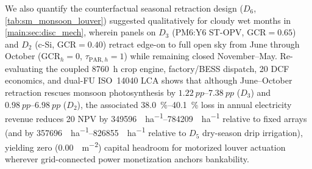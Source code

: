 \documentclass[preprint,12pt,a4paper]{elsarticle}
\begin{document}
We also quantify the counterfactual seasonal retraction design ($D_6$, \cref{tab:sm_monsoon_louver}) suggested qualitatively for cloudy wet months in \cref{main:sec:disc_mech}, wherein panels on $D_3$ (PM6:Y6 ST-OPV, $\mathrm{GCR}=\num{0.65}$) and $D_2$ (c-Si, $\mathrm{GCR}=\num{0.40}$) retract edge-on to full open sky from June through October ($\mathrm{GCR}_h=0$, $\tau_{\mathrm{PAR},h}=1$) while remaining closed November--May. Re-evaluating the coupled \qty{8760}{\hour} crop engine, factory/BESS dispatch, \qty{20}{\yr} DCF economics, and dual-FU ISO~14040 LCA shows that although June--October retraction rescues monsoon photosynthesis by $\qtyrange{+1.22}{+7.38}{pp}$ ($D_3$) and $\qtyrange{+0.98}{+6.98}{pp}$ ($D_2$), the associated \qtyrange{38.0}{40.1}{\percent} loss in annual electricity revenue reduces \qty{20}{\yr} NPV by \qtyrange{349596}{784209}{\USD\per\hectare} relative to fixed arrays (and by \qtyrange{357696}{826855}{\USD\per\hectare} relative to $D_5$ dry-season drip irrigation), yielding zero (\qty{0.00}{\USD\per\square\meter}) capital headroom for motorized louver actuation wherever grid-connected power monetization anchors bankability.
\end{document}
